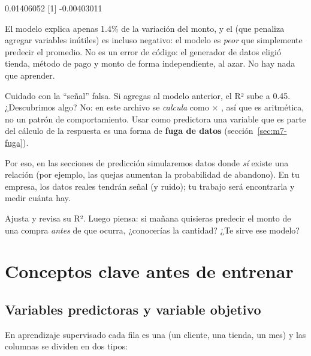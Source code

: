 \begin{rsalida}
[1] 0.01406052
[1] -0.00403011
\end{rsalida}

El modelo explica apenas 1.4\% de la variación del monto, y el
 (que penaliza agregar variables inútiles) es incluso
negativo: el modelo es \emph{peor} que simplemente predecir el promedio. No es
un error de código: el generador de datos eligió tienda, método de pago y monto
de forma independiente, al azar. No hay nada que aprender.

\begin{advertencia}
Cuidado con la ``señal'' falsa. Si agregas  al modelo anterior,
el R² sube a 0.45. ¿Descubrimos algo? No: en este archivo
 se \emph{calcula} como  $\times$
, así que es aritmética, no un patrón de comportamiento.
Usar como predictora una variable que es parte del cálculo de la respuesta es
una forma de \textbf{fuga de datos} (sección~\ref{sec:m7-fuga}).
\end{advertencia}

Por eso, en las secciones de predicción simularemos datos donde \emph{sí}
existe una relación (por ejemplo, las quejas aumentan la probabilidad de
abandono). En tu empresa, los datos reales tendrán señal (y ruido); tu trabajo
será encontrarla y medir cuánta hay.

\begin{hazlotu}
Ajusta 
y revisa su R². Luego piensa: si mañana quisieras predecir el monto de una
compra \emph{antes} de que ocurra, ¿conocerías la cantidad? ¿Te sirve ese
modelo?
\end{hazlotu}

\section{Conceptos clave antes de entrenar}
\label{sec:m7-conceptos}

\subsection{Variables predictoras y variable objetivo}

En aprendizaje supervisado cada fila es una  (un cliente,
una tienda, un mes) y las columnas se dividen en dos tipos:

